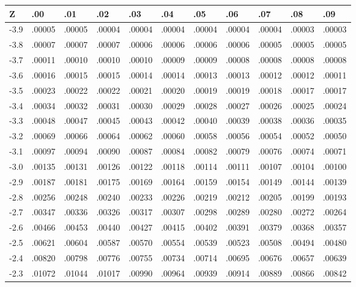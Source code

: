 \documentclass[]{article}
\begin{document}
\begin{center}
    \begin{tabular}{l|llllllllll}
        Z    & .00    & .01    & .02    & .03    & .04    & .05    & .06    & .07    & .08    & .09    \\
        \hline
        -3.9 & .00005 & .00005 & .00004 & .00004 & .00004 & .00004 & .00004 & .00004 & .00003 & .00003 \\
        -3.8 & .00007 & .00007 & .00007 & .00006 & .00006 & .00006 & .00006 & .00005 & .00005 & .00005 \\
        -3.7 & .00011 & .00010 & .00010 & .00010 & .00009 & .00009 & .00008 & .00008 & .00008 & .00008 \\
        -3.6 & .00016 & .00015 & .00015 & .00014 & .00014 & .00013 & .00013 & .00012 & .00012 & .00011 \\
        -3.5 & .00023 & .00022 & .00022 & .00021 & .00020 & .00019 & .00019 & .00018 & .00017 & .00017 \\
        -3.4 & .00034 & .00032 & .00031 & .00030 & .00029 & .00028 & .00027 & .00026 & .00025 & .00024 \\
        -3.3 & .00048 & .00047 & .00045 & .00043 & .00042 & .00040 & .00039 & .00038 & .00036 & .00035 \\
        -3.2 & .00069 & .00066 & .00064 & .00062 & .00060 & .00058 & .00056 & .00054 & .00052 & .00050 \\
        -3.1 & .00097 & .00094 & .00090 & .00087 & .00084 & .00082 & .00079 & .00076 & .00074 & .00071 \\
        -3.0 & .00135 & .00131 & .00126 & .00122 & .00118 & .00114 & .00111 & .00107 & .00104 & .00100 \\
        -2.9 & .00187 & .00181 & .00175 & .00169 & .00164 & .00159 & .00154 & .00149 & .00144 & .00139 \\
        -2.8 & .00256 & .00248 & .00240 & .00233 & .00226 & .00219 & .00212 & .00205 & .00199 & .00193 \\
        -2.7 & .00347 & .00336 & .00326 & .00317 & .00307 & .00298 & .00289 & .00280 & .00272 & .00264 \\
        -2.6 & .00466 & .00453 & .00440 & .00427 & .00415 & .00402 & .00391 & .00379 & .00368 & .00357 \\
        -2.5 & .00621 & .00604 & .00587 & .00570 & .00554 & .00539 & .00523 & .00508 & .00494 & .00480 \\
        -2.4 & .00820 & .00798 & .00776 & .00755 & .00734 & .00714 & .00695 & .00676 & .00657 & .00639 \\
        -2.3 & .01072 & .01044 & .01017 & .00990 & .00964 & .00939 & .00914 & .00889 & .00866 & .00842 \\

\end{tabular}
\end{center}
\end{document}
